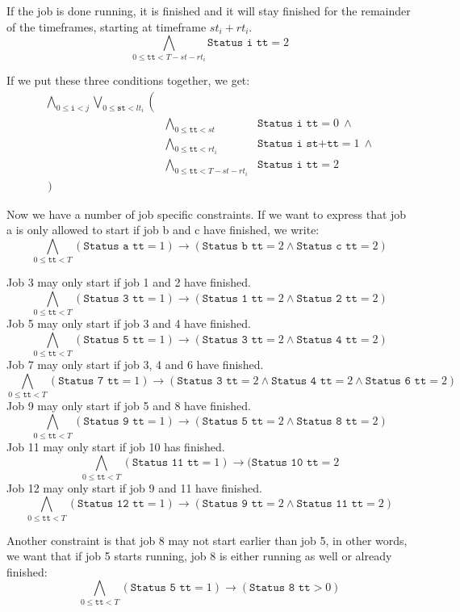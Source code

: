 \documentclass[12pt]{article}
\begin{document}
If the job is done running, it is finished and it will stay finished for the remainder of the timeframes, starting at timeframe $st_i + rt_i$.
\[ \bigwedge_{0 \le \texttt{tt} < T-st-rt_i} \texttt{Status i tt} = 2 \]

If we put these three conditions together, we get:
\[ \begin{array}{rll}
    \bigwedge_{0 \le \texttt{i} < j} \bigvee_{0 \le \texttt{st} < lt_i} \left( \right.&& \\
    & \bigwedge_{0 \le \texttt{tt} < st} & \texttt{Status i tt} = 0 ~ \wedge \\
    & \bigwedge_{0 \le \texttt{tt} < rt_i} & \texttt{Status i st+tt} = 1 ~ \wedge \\
    & \bigwedge_{0 \le \texttt{tt} < T-st-rt_i} & \texttt{Status i tt} = 2 \\
\left. \right)
\end{array} \]

Now we have a number of job specific constraints. 
If we want to express that job a is only allowed to start if job b and c have finished, we write: 
\[ \bigwedge_{0 \le \texttt{tt} < T} (\texttt{Status a tt} = 1) \rightarrow (\texttt{Status b tt} = 2 \wedge \texttt{Status c tt} = 2) \]

Job 3 may only start if job 1 and 2 have finished.
\[ \bigwedge_{0 \le \texttt{tt} < T} (\texttt{Status 3 tt} = 1) \rightarrow (\texttt{Status 1 tt} = 2 \wedge \texttt{Status 2 tt} = 2) \]
Job 5 may only start if job 3 and 4 have finished.
\[ \bigwedge_{0 \le \texttt{tt} < T} (\texttt{Status 5 tt} = 1) \rightarrow (\texttt{Status 3 tt} = 2 \wedge \texttt{Status 4 tt} = 2) \]
Job 7 may only start if job 3, 4 and 6 have finished.
\[ \bigwedge_{0 \le \texttt{tt} < T} (\texttt{Status 7 tt} = 1) \rightarrow (\texttt{Status 3 tt} = 2 \wedge \texttt{Status 4 tt} = 2 \wedge \texttt{Status 6 tt} = 2) \]
Job 9 may only start if job 5 and 8 have finished.
\[ \bigwedge_{0 \le \texttt{tt} < T} (\texttt{Status 9 tt} = 1) \rightarrow (\texttt{Status 5 tt} = 2 \wedge \texttt{Status 8 tt} = 2) \]
Job 11 may only start if job 10 has finished.
\[ \bigwedge_{0 \le \texttt{tt} < T} (\texttt{Status 11 tt} = 1) \rightarrow (\texttt{Status 10 tt} = 2\]
Job 12 may only start if job 9 and 11 have finished.
\[ \bigwedge_{0 \le \texttt{tt} < T} (\texttt{Status 12 tt} = 1) \rightarrow (\texttt{Status 9 tt} = 2 \wedge \texttt{Status 11 tt} = 2) \]

Another constraint is that job 8 may not start earlier than job 5, in other words, we want that if job 5 starts running, job 8 is either running as well or already finished:
\[ \bigwedge_{0 \le \texttt{tt} < T} (\texttt{Status 5 tt} = 1) \rightarrow (\texttt{Status 8 tt} > 0) \]
\end{document}
